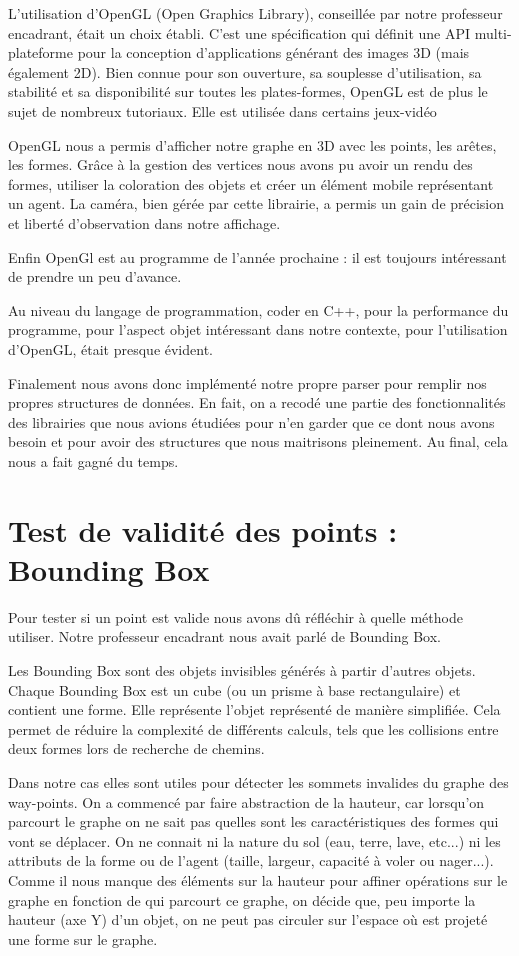 \documentclass[a4paper,12pt]{report}
\begin{document}
L'utilisation d'OpenGL (Open Graphics Library), conseillée par notre professeur encadrant, était un choix établi. C'est une spécification qui définit une API multi-plateforme pour la conception d'applications générant des images 3D (mais également 2D). Bien connue pour son ouverture, sa souplesse d'utilisation, sa stabilité et sa disponibilité sur toutes les plates-formes, OpenGL est de plus le sujet de nombreux tutoriaux. Elle est utilisée dans certains jeux-vidéo

OpenGL nous a permis d'afficher notre graphe en 3D avec les points, les arêtes, les formes. Grâce à la gestion des vertices nous avons pu avoir un rendu des formes, utiliser la coloration des objets et créer un élément mobile représentant un agent. La caméra, bien gérée par cette librairie, a permis un gain de précision et liberté d'observation dans notre affichage.

Enfin OpenGl est au programme de l'année prochaine : il est toujours intéressant de prendre un peu d'avance. 




Au niveau du langage de programmation, coder en C++, pour la performance du programme, pour l'aspect objet intéressant dans notre contexte, pour l'utilisation d'OpenGL, était presque évident.

Finalement nous avons donc implémenté notre propre parser pour remplir nos propres structures de données. En fait, on a recodé une partie des fonctionnalités des librairies que nous avions étudiées pour n'en garder que ce dont nous avons besoin et pour avoir des structures que nous maitrisons pleinement. Au final, cela nous a fait gagné du temps.

\section{Test de validité des points : Bounding Box}

Pour tester si un point est valide nous avons dû réfléchir à quelle méthode utiliser. Notre professeur encadrant nous avait parlé de Bounding Box.

Les Bounding Box sont des objets invisibles générés à partir d'autres objets. Chaque Bounding Box est un cube (ou un prisme à base rectangulaire) et contient une forme. Elle représente l'objet représenté de manière simplifiée. Cela permet de réduire la complexité de différents calculs, tels que les collisions entre deux formes lors de recherche de chemins.

Dans notre cas elles sont utiles pour détecter les sommets invalides du graphe des way-points. On a commencé par faire abstraction de la hauteur, car lorsqu'on parcourt le graphe on ne sait pas quelles sont les caractéristiques des formes qui vont se déplacer. On ne connait ni la nature du sol (eau, terre, lave, etc...) ni les attributs de la forme ou de l'agent (taille, largeur, capacité à voler ou nager...). Comme il nous manque des éléments sur la hauteur pour affiner opérations sur le graphe en fonction de qui parcourt ce graphe, on décide que, peu importe la hauteur (axe Y) d'un objet, on ne peut pas circuler sur l'espace où est projeté une forme sur le graphe. 
\end{document}
